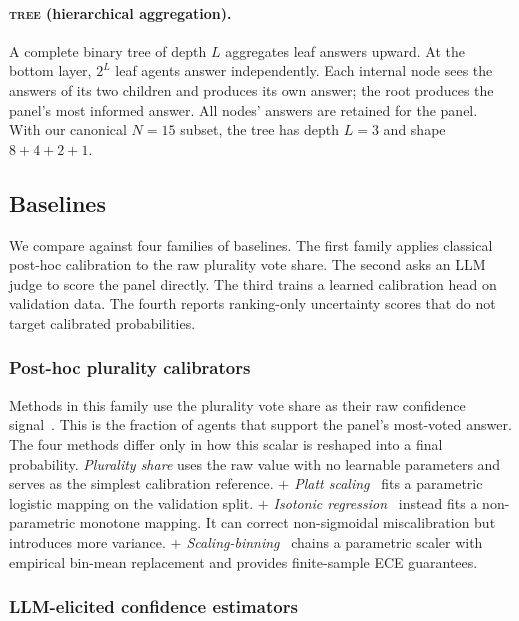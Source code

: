 \paragraph{\textsc{tree} (hierarchical aggregation).}
A complete binary tree of depth $L$ aggregates leaf answers upward. At the bottom layer, $2^{L}$ leaf agents answer independently. Each internal node sees the answers of its two children and produces its own answer; the root produces the panel's most informed answer. All nodes' answers are retained for the panel. With our canonical $N{=}15$ subset, the tree has depth $L{=}3$ and shape $8{+}4{+}2{+}1$.

\subsection{Baselines}
We compare \methodname{} against four families of baselines. The first family applies classical post-hoc calibration to the raw plurality vote share. The second asks an LLM judge to score the panel directly. The third trains a learned calibration head on validation data. The fourth reports ranking-only uncertainty scores that do not target
calibrated probabilities.

\subsubsection{Post-hoc plurality calibrators}
\label{app:baselines-posthoc}

Methods in this family use the plurality vote share as their raw
confidence signal~\citep{kuncheva2004combining}. This is the fraction
of agents that support the panel's most-voted answer. The four methods
differ only in how this scalar is reshaped into a final probability.
\emph{Plurality share} uses the raw value with no learnable parameters
and serves as the simplest calibration reference.
\emph{$+$ Platt scaling}~\citep{platt1999probabilistic} fits a
parametric logistic mapping on the validation split.
\emph{$+$ Isotonic regression}~\citep{zadrozny2002transforming}
instead fits a non-parametric monotone mapping. It can correct
non-sigmoidal miscalibration but introduces more variance.
\emph{$+$ Scaling-binning}~\citep{kumar2019verified} chains a
parametric scaler with empirical bin-mean replacement and provides
finite-sample ECE guarantees.

\subsubsection{LLM-elicited confidence estimators}
\label{app:baselines-llm}

